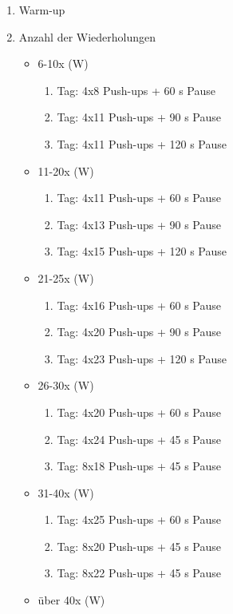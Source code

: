 \begin{enumerate}
\item
  Warm-up
\item
  Anzahl der Wiederholungen

  \begin{itemize}
  \item
    6-10x (W)

    \begin{enumerate}
    \def\labelenumii{\arabic{enumii}.}
    \item
      Tag: 4x8 Push-ups + 60 s Pause
    \item
      Tag: 4x11 Push-ups + 90 s Pause
    \item
      Tag: 4x11 Push-ups + 120 s Pause
    \end{enumerate}
  \item
    11-20x (W)

    \begin{enumerate}
    \def\labelenumii{\arabic{enumii}.}
    \item
      Tag: 4x11 Push-ups + 60 s Pause
    \item
      Tag: 4x13 Push-ups + 90 s Pause
    \item
      Tag: 4x15 Push-ups + 120 s Pause
    \end{enumerate}
  \item
    21-25x (W)

    \begin{enumerate}
    \def\labelenumii{\arabic{enumii}.}
    \item
      Tag: 4x16 Push-ups + 60 s Pause
    \item
      Tag: 4x20 Push-ups + 90 s Pause
    \item
      Tag: 4x23 Push-ups + 120 s Pause
    \end{enumerate}
  \item
    26-30x (W)

    \begin{enumerate}
    \def\labelenumii{\arabic{enumii}.}
    \item
      Tag: 4x20 Push-ups + 60 s Pause
    \item
      Tag: 4x24 Push-ups + 45 s Pause
    \item
      Tag: 8x18 Push-ups + 45 s Pause
    \end{enumerate}
  \item
    31-40x (W)

    \begin{enumerate}
    \def\labelenumii{\arabic{enumii}.}
    \item
      Tag: 4x25 Push-ups + 60 s Pause
    \item
      Tag: 8x20 Push-ups + 45 s Pause
    \item
      Tag: 8x22 Push-ups + 45 s Pause
    \end{enumerate}
  \item
    über 40x (W)


\end{itemize}
\end{enumerate}
